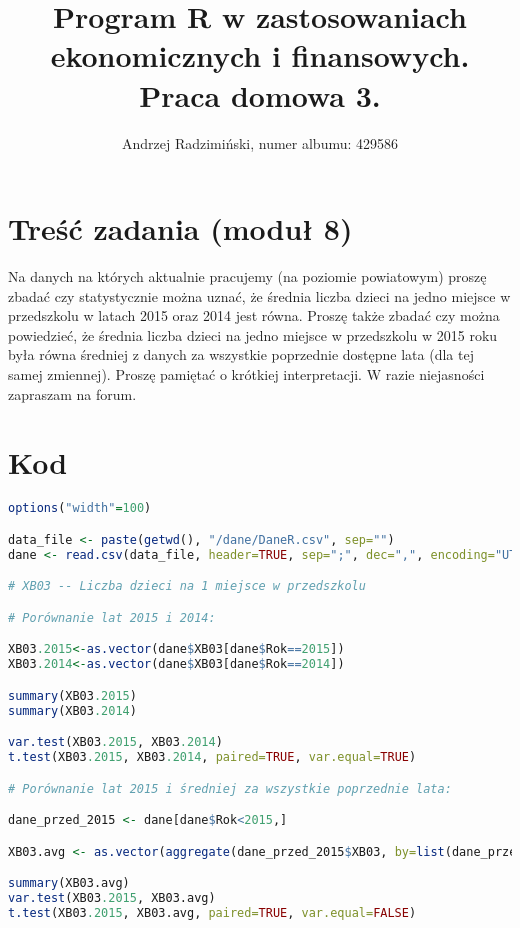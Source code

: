 

\title{Program R w zastosowaniach ekonomicznych i finansowych. Praca domowa 3.}
\author{Andrzej Radzimiński, numer albumu: 429586}
\date{}



\renewcommand{\contentsname}{Spis treści}

\setlength{\parindent}{0pt}
\noindent

\maketitle



\section*{Treść zadania (moduł 8)}

Na danych na których aktualnie pracujemy (na poziomie powiatowym) proszę zbadać czy
statystycznie można uznać, że średnia liczba dzieci na jedno miejsce w przedszkolu w latach
2015 oraz 2014 jest równa. Proszę także zbadać czy można powiedzieć, że średnia liczba
dzieci na jedno miejsce w przedszkolu w 2015 roku była równa średniej z danych za wszystkie
poprzednie dostępne lata (dla tej samej zmiennej). Proszę pamiętać o krótkiej interpretacji. W
razie niejasności zapraszam na forum.

\newpage

\section*{Kod}

\begin{lstlisting}[language=R]
options("width"=100)

data_file <- paste(getwd(), "/dane/DaneR.csv", sep="")
dane <- read.csv(data_file, header=TRUE, sep=";", dec=",", encoding="UTF-8")

# XB03 -- Liczba dzieci na 1 miejsce w przedszkolu

# Porównanie lat 2015 i 2014:

XB03.2015<-as.vector(dane$XB03[dane$Rok==2015])
XB03.2014<-as.vector(dane$XB03[dane$Rok==2014])

summary(XB03.2015)
summary(XB03.2014)

var.test(XB03.2015, XB03.2014)
t.test(XB03.2015, XB03.2014, paired=TRUE, var.equal=TRUE)

# Porównanie lat 2015 i średniej za wszystkie poprzednie lata:

dane_przed_2015 <- dane[dane$Rok<2015,]

XB03.avg <- as.vector(aggregate(dane_przed_2015$XB03, by=list(dane_przed_2015$Kod_powiat), FUN=mean, na.rm=TRUE)$x)

summary(XB03.avg)
var.test(XB03.2015, XB03.avg)
t.test(XB03.2015, XB03.avg, paired=TRUE, var.equal=FALSE)
\end{lstlisting}

